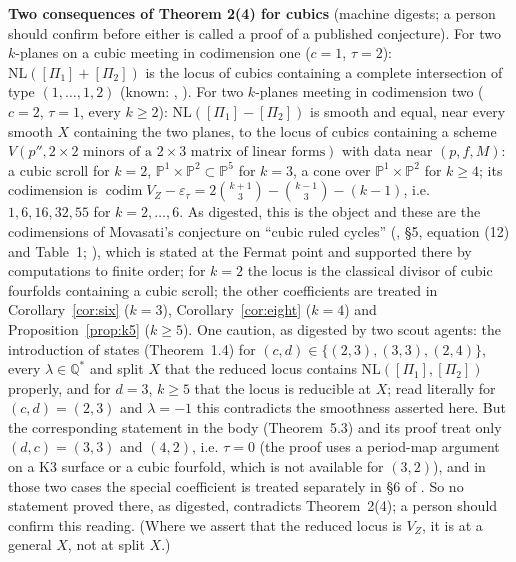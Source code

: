 \documentclass[11pt]{article}
\numberwithin{equation}{section}
\theoremstyle{remark}
\newcommand{\PP}{\mathbb{P}}
\newcommand{\QQ}{\mathbb{Q}}
\newcommand{\NL}{\mathrm{NL}}
\newcommand{\VZ}{V_Z}
\newcommand{\codim}{\operatorname{codim}}
\newcommand{\et}{\varepsilon_\tau}
\newcommand{\run}[1]{\medskip\noindent\textbf{#1}}
\begin{document}
\run{Two consequences of Theorem 2(4) for cubics} (machine digests; a person should confirm before either is
called a proof of a published conjecture). For two $k$-planes on a cubic meeting in codimension one ($c=1$,
$\tau=2$): $\NL([\Pi_1]+[\Pi_2])$ is the locus of cubics containing a complete intersection of type
$(1,\dots,1,2)$ (known: \cite[Thm~5]{Mo}, \cite{Kl2}). For two $k$-planes meeting in codimension two ($c=2$,
$\tau=1$, every $k\ge2$): $\NL([\Pi_1]-[\Pi_2])$ is smooth and equal, near every smooth $X$ containing the two
planes, to the locus of cubics containing a scheme $V(p'',\text{$2\times2$ minors of a $2\times3$ matrix of linear
forms})$ with data near $(p,f,M)$: a cubic scroll for $k=2$, $\PP^1\times\PP^2\subset\PP^5$ for $k=3$, a cone over
$\PP^1\times\PP^2$ for $k\ge4$; its codimension is $\codim\VZ-\et=2\binom{k+1}3-\binom{k-1}3-(k-1)$, i.e.
$1,6,16,32,55$ for $k=2,\dots,6$. As digested, this is the object and these are the codimensions of Movasati's
conjecture on ``cubic ruled cycles'' (\cite{Mo19}, \S5, equation (12) and Table~1; \cite[Conj.~7]{Mo}), which is
stated at the Fermat point and supported there by computations to finite order; for $k=2$ the locus is the
classical divisor of cubic fourfolds containing a cubic scroll; the other coefficients are treated in
Corollary~\ref{cor:six} ($k=3$), Corollary~\ref{cor:eight} ($k=4$) and Proposition~\ref{prop:k5} ($k\ge5$). One caution, as digested by two scout agents: the introduction of \cite{Kl} states (Theorem~1.4) for
$(c,d)\in\{(2,3),(3,3),(2,4)\}$, every $\lambda\in\QQ^*$ and split $X$ that the reduced locus contains
$\NL([\Pi_1],[\Pi_2])$ properly, and for $d=3$, $k\ge5$ that the locus is reducible at $X$; read literally for
$(c,d)=(2,3)$ and $\lambda=-1$ this contradicts the smoothness asserted here. But the corresponding statement
in the body (Theorem~5.3) and its proof treat only $(d,c)=(3,3)$ and $(4,2)$, i.e. $\tau=0$ (the proof uses a
period-map argument on a K3 surface or a cubic fourfold, which is not available for $(3,2)$), and in those two
cases the special coefficient is treated separately in \S6 of \cite{Kl}. So no statement proved there, as
digested, contradicts Theorem~2(4); a person should confirm this reading. (Where we assert that the reduced
locus is $\VZ$, it is at a general $X$, not at split $X$.)
\end{document}
